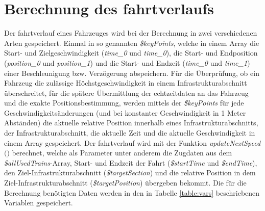 \section{Berechnung des \Gls{fahrtverlauf}s} \label{kapitelFahrtverlauf}
Der \Gls{fahrtverlauf} eines Fahrzeuges wird bei der Berechnung in zwei verschiedenen Arten gespeichert. Einmal in so genannten \textit{\$keyPoints}, welche in einem Array die Start- und Zielgeschwindigkeit (\textit{time\_0} und \textit{time\_0}), die Start- und Endposition (\textit{position\_0} und \textit{position\_1}) und die Start- und Endzeit (\textit{time\_0} und \textit{time\_1}) einer Beschleunigung bzw. Verzögerung abspeichern. Für die Überprüfung, ob ein Fahrzeug die zulässige Höchstgeschwindigkeit in einem Infrastrukturabschnitt überschreitet, für die spätere Übermittlung der \Gls{echtzeitdaten} an das Fahrzeug und die exakte Positionsbestimmung, werden mittels der \textit{\$keyPoints} für jede Geschwindigkeitsänderungen (und bei konstanter Geschwindigkeit in 1 Meter Abständen) die aktuelle relative Position innerhalb eines Infrastrukturabschnitts, der Infrastrukturabschnitt, die aktuelle Zeit und die aktuelle Geschwindigkeit in einem Array gespeichert.
Der \Gls{fahrtverlauf} wird mit der Funktion \textit{updateNextSpeed$($$)$} berechnet, welche als Parameter unter anderem die Zugdaten aus dem \textit{\$allUsedTrains}-Array, Start- und Endzeit der Fahrt (\textit{\$startTime} und \textit{\$endTime}), den Ziel-Infrastrukturabschnitt (\textit{\$targetSection}) und die relative Position in dem Ziel-Infrastrukturabschnitt (\textit{\$targetPosition}) übergeben bekommt.
Die für die Berechnung benötigten Daten werden in den in Tabelle \ref{table:vars} beschriebenen Variablen gespeichert.
